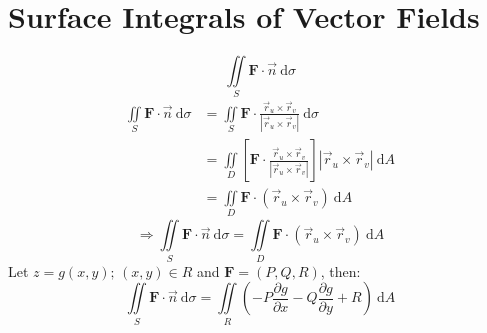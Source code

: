 \documentclass[12pt, fleqn]{book}
\begin{document}
     	\section{Surface Integrals of Vector Fields}
     		\begin{equation}
     			\iint\limits_S \mathbf{F} \cdot \vec{n} \ \mathrm{d}\sigma
     		\end{equation}
     		\begin{equation*}
     			\begin{split}
     				\iint\limits_S \mathbf{F} \cdot \vec{n} \ \mathrm{d}\sigma
     				&  = \iint\limits_S \mathbf{F} \cdot \frac{\vec{r}_u \times \vec{r}_v}{\left|\vec{r}_u \times \vec{r}_v\right|} \ \mathrm{d}\sigma \\
     				& = \iint\limits_D \left[\mathbf{F} \cdot \frac{\vec{r}_u \times \vec{r}_v}{\left|\vec{r}_u \times \vec{r}_v\right|}\right] \left|\vec{r}_u \times \vec{r}_v\right| \ \mathrm{d}A \\
     				& = \iint\limits_D \mathbf{F} \cdot \left(\vec{r}_u \times \vec{r}_v\right) \ \mathrm{d}A
     			\end{split}
     		\end{equation*}
     	    \begin{equation}
     	    	\Rightarrow 
     	    	\iint\limits_S \mathbf{F} \cdot \vec{n} \ \mathrm{d}\sigma = \iint\limits_D \mathbf{F} \cdot \left(\vec{r}_u \times \vec{r}_v\right) \ \mathrm{d}A
     	    \end{equation}
     		Let $z = g(x, y); \, (x, y) \in R$ and $\mathbf{F} = (P, Q, R)$, then:
     		\begin{equation}
     			\iint\limits_S \mathbf{F} \cdot \vec{n} \ \mathrm{d}\sigma = 
     			\iint\limits_R \left(-P \frac{\partial g}{\partial x} - Q\frac{\partial g}{\partial y} + R\right) \ \mathrm{d}A
     		\end{equation}
     	
     	
     	
     	
     	
     	
     	
     	
     	
     	
     	
     	
     	
     	
     	
     	
     	
     	
     	
     	
     	
     	
     	
     	
     	
     	
     	
     	
     	
     	
     	
     	
     	
     	
     	
     	
     	
     	
\end{document}
